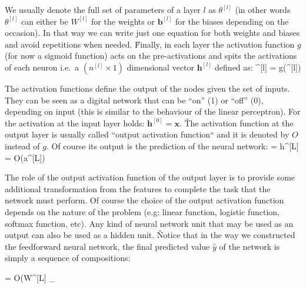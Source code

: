 \vspace{10pt}

We usually denote the full set of parameters of a layer $l$ as $\theta^{[l]}$ (in other words $\theta^{[l]}$ can
either be $W^{[l]} $ for the weights or $\boldsymbol{b}^{[l]}$ for the biases depending on the occasion). In that way
we can write just one equation for both weights and biases and avoid repetitions when needed. \v

Finally, in each layer the activation function $g$ (for now a sigmoid function) acts on the pre-activations and spits
the activations of each neuron i.e.\ a $(n^{[l]} \times 1)$ dimensional vector $\boldsymbol{h}^{[l]}$ defined as:
\bse
{}^{[l]} = g(^{[l]})
\ese

The activation functions define the output of the nodes given the set of inputs. They can be seen as a digital
network that can be ``on'' (1) or ``off'' (0), depending on input (this is similar to the behaviour of the linear
perceptron). For the activation at the input layer holds: $\boldsymbol{h}^{[0]} = \boldsymbol{x}$. \v

The activation function at the output layer is usually called ``output activation function`` and it is denoted by $O$
instead of $g$. Of course its output is the prediction of the neural network:
\bse
{} = h^{[L]} = O(a^{[L]})
\ese

The role of the output activation function of the output layer is to provide some additional transformation from the
features to complete the task that the network must perform. Of course the choice of the output activation function
depends on the nature of the problem (e.g: linear function, logistic function, softmax function, etc). Any kind of
neural network unit that may be used as an output can also be used as a hidden unit. \v

Notice that in the way we constructed the feedforward neural network, the final predicted value $\hat{y}$ of the
network is simply a sequence of compositions:

\bse
{} = O(W^{[L]} \cdot {}_{}
\ese

\vspace{8pt}

